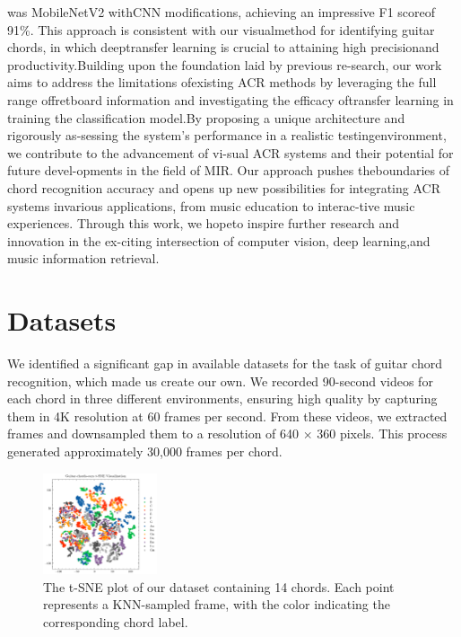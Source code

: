 \documentclass[10pt,twocolumn,letterpaper]{article}
\begin{document}
was MobileNetV2 withCNN modifications, achieving an impressive F1 scoreof 91\%.  This approach is consistent with our visualmethod for identifying guitar chords,  in which deeptransfer learning is crucial to attaining high precisionand productivity.Building upon the foundation laid by previous re-search,  our  work  aims  to  address  the  limitations  ofexisting ACR methods by leveraging the full range offretboard information and investigating the efficacy oftransfer learning in training the classification model.By proposing a unique architecture and rigorously as-sessing the system’s performance in a realistic testingenvironment, we contribute to the advancement of vi-sual ACR systems and their potential for future devel-opments in the field of MIR. Our approach pushes theboundaries of chord recognition accuracy and opens up new possibilities for integrating ACR systems invarious applications, from music education to interac-tive music experiences.  Through this work, we hopeto inspire further research and innovation in the ex-citing intersection of computer vision, deep learning,and music information retrieval.

\section{Datasets}
We identified a significant gap in available datasets for the task of guitar chord recognition, which made us create our own. We recorded 90-second videos for each chord in three different environments, ensuring high quality by capturing them in 4K resolution at 60 frames per second. From these videos, we extracted frames and downsampled them to a resolution of 640 $\times$ 360 pixels. This process generated approximately 30,000 frames per chord.

\begin{figure}[h]
  \centering
  \includegraphics[width=0.3\textwidth]{images/final/Guitar-chords-ours_tsne_plot.png}
  \caption{The t-SNE plot of our dataset containing 14 chords. Each point represents a KNN-sampled frame, with the color indicating the corresponding chord label.}
  \label{fig:ours-tsne-plot}
\end{figure}
\end{document}
